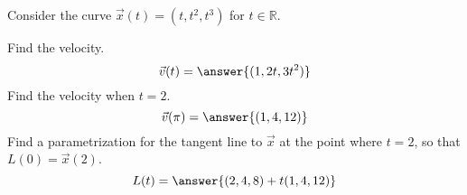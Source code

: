 \begin{problem}
Consider the curve $\vec{x}(t) = (t, t^2, t^3)$ for $t\in\mathbb{R}$.

Find the velocity.
\[
\vec{v}(t) = \answer{(1, 2t, 3t^2)}
\]
Find the velocity when $t = 2$.
\[
\vec{v}(\pi) = \answer{(1,4,12)}
\]
Find a parametrization for the tangent line to $\vec{x}$ at the point where $t = 2$, so that $L(0) = \vec{x}(2)$.
\[
L(t) = \answer{(2,4,8) + t(1,4,12)}
\]
\end{problem}